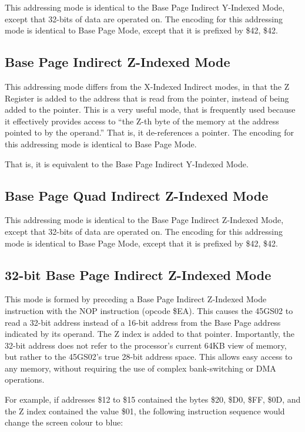 This addressing mode is identical to the Base Page Indirect Y-Indexed Mode, except that
32-bits of data are operated on. The encoding for this addressing mode is identical to
Base Page Mode, except that it is prefixed by \$42, \$42.

\subsection{Base Page Indirect Z-Indexed Mode}

This addressing mode differs from the X-Indexed Indirect modes, in that the Z Register is
added to the address that is read from the pointer, instead of being added to the pointer.
This is a very useful mode, that is frequently used because it effectively provides access to
``the Z-th byte of the memory at the address pointed to by the operand.'' That is, it de-references
a pointer.
The encoding for this addressing mode is identical to Base Page Mode.

That is, it is equivalent to the Base Page Indirect Y-Indexed Mode.

\subsection{Base Page Quad Indirect Z-Indexed Mode}

This addressing mode is identical to the Base Page Indirect Z-Indexed Mode, except that
32-bits of data are operated on. The encoding for this addressing mode is identical to
Base Page Mode, except that it is prefixed by \$42, \$42.

\subsection{32-bit Base Page Indirect Z-Indexed Mode}

This mode is formed by preceding a Base Page Indirect Z-Indexed Mode instruction with
the {NOP} instruction (opcode \$EA).  This causes the 45GS02 to read a 32-bit address instead
of a 16-bit address from the Base Page address indicated by its operand.  The Z index is added
to that pointer.  Importantly, the 32-bit address does not refer to the processor's current 64KB
view of memory, but rather to the 45GS02's true 28-bit address space. This allows easy access
to any memory, without requiring the use of complex bank-switching or DMA operations.

For example, if addresses \$12 to \$15 contained the bytes \$20, \$D0, \$FF, \$0D, and the
Z index contained the value \$01, the following instruction sequence would change the screen
colour to blue:

